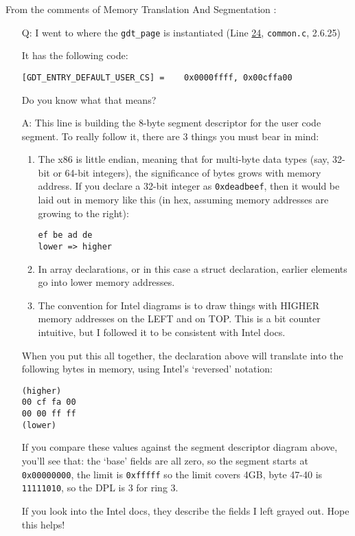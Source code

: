 From the comments of Memory Translation And Segmentation :
\begin{itemize}
\item[Q:] I went to where the \texttt{gdt\_page} is instantiated
  (Line \href{http://lxr.linux.no/linux+v2.6.25.6/arch/x86/kernel/cpu/common.c\#L24}{24},
    \texttt{common.c}, 2.6.25)

  It has the following code:

  \texttt{[GDT\_ENTRY\_DEFAULT\_USER\_CS] = { { { 0x0000ffff, 0x00cffa00 } } }}

  Do you know what that means?
\item[A:] This line is building the 8-byte segment descriptor for the user code
  segment. To really follow it, there are 3 things you must bear in mind:
  \begin{enumerate}
  \item The x86 is little endian, meaning that for multi-byte data types (say, 32-bit or
    64-bit integers), the significance of bytes grows with memory address. If you declare
    a 32-bit integer as \texttt{0xdeadbeef}, then it would be laid out in memory like this
    (in hex, assuming memory addresses are growing to the right):
\begin{verbatim}
ef be ad de
lower => higher
\end{verbatim}
  \item In array declarations, or in this case a struct declaration, earlier elements go
    into lower memory addresses.
  \item The convention for Intel diagrams is to draw things with HIGHER memory addresses
    on the LEFT and on TOP. This is a bit counter intuitive, but I followed it to be
    consistent with Intel docs.
  \end{enumerate}
  When you put this all together, the declaration above will translate into the following
  bytes in memory, using Intel's ‘reversed’ notation:
\begin{verbatim}
(higher)
00 cf fa 00
00 00 ff ff
(lower)
\end{verbatim}
  If you compare these values against the segment descriptor diagram above, you'll see
  that: the ‘base’ fields are all zero, so the segment starts at \texttt{0x00000000}, the
  limit is \texttt{0xfffff} so the limit covers 4GB, byte 47-40 is \texttt{11111010}, so the
  DPL is 3 for ring 3.

  If you look into the Intel docs, they describe the fields I left grayed out. Hope this
  helps!
\end{itemize}

